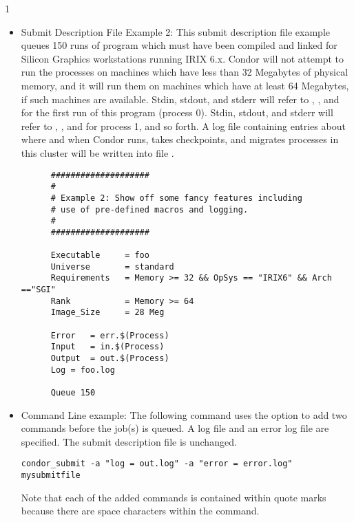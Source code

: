 \begin{ManPage}{\label{man-condor-submit}}{1}
\begin{itemize}
\item{Submit Description File Example 2:} This submit description file
example queues 150
runs of program  which must have been compiled and linked for
Silicon Graphics workstations running IRIX 6.x.
Condor will not attempt
to run the processes on machines which have less than 32 Megabytes of
physical memory, and it will run them on machines which have at least 64
Megabytes, if such machines are available.
Stdin, stdout, and stderr will
refer to , , and  for the first run
of this program (process 0).
Stdin, stdout, and stderr will refer to
, , and  for process 1, and so forth.
A log file containing entries
about where and when Condor runs, takes checkpoints, and migrates processes
in this cluster will be written into file .

\begin{verbatim}
      ####################                                                    
      #                                                                       
      # Example 2: Show off some fancy features including
      # use of pre-defined macros and logging.                                
      #                                                                       
      ####################                                                    
                                                                          
      Executable     = foo                                                    
      Universe       = standard
      Requirements   = Memory >= 32 && OpSys == "IRIX6" && Arch =="SGI"     
      Rank           = Memory >= 64
      Image_Size     = 28 Meg                                                 
                                                                          
      Error   = err.$(Process)                                                
      Input   = in.$(Process)                                                 
      Output  = out.$(Process)                                                
      Log = foo.log                                                                       
                                                                          
      Queue 150
\end{verbatim}

\item{Command Line example:} The following command uses the
 option to add two commands before the job(s) is queued.
A log file and an error log file are specified.
The submit description file is unchanged.
\footnotesize
\normalsize
\begin{verbatim}
condor_submit -a "log = out.log" -a "error = error.log" mysubmitfile
\end{verbatim}
Note that each of the added commands is contained within quote marks
because there are space characters within the command.


\end{itemize}
\end{ManPage}
